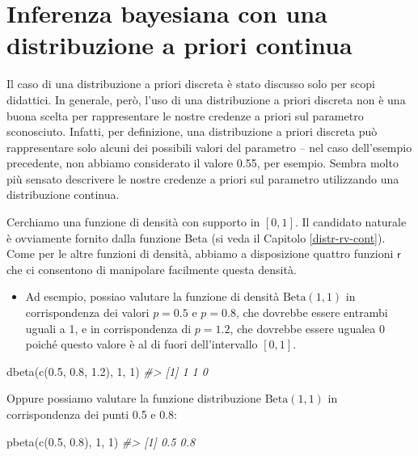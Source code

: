 \documentclass[
  11pt,
]{krantz}
\makeatletter
\newenvironment{Shaded}{\begin{snugshade}}{\end{snugshade}}
\newcommand{\CommentTok}[1]{\textcolor[rgb]{0.37,0.37,0.37}{\textit{#1}}}
\newcommand{\DecValTok}[1]{\textcolor[rgb]{0.06,0.06,0.06}{#1}}
\newcommand{\FloatTok}[1]{\textcolor[rgb]{0.06,0.06,0.06}{#1}}
\newcommand{\FunctionTok}[1]{\textcolor[rgb]{0,0,0}{#1}}
\newcommand{\NormalTok}[1]{#1}
\providecommand{\tightlist}{%
  \setlength{\itemsep}{0pt}\setlength{\parskip}{0pt}}
\newenvironment{kframe}{%
\medskip{}
\setlength{\fboxsep}{.8em}
 \def\at@end@of@kframe{}%
 \ifinner\ifhmode%
  \def\at@end@of@kframe{\end{minipage}}%
  \begin{minipage}{\columnwidth}%
 \fi\fi%
 \def\FrameCommand##1{\hskip\@totalleftmargin \hskip-\fboxsep
 \colorbox{shadecolor}{##1}\hskip-\fboxsep
     \hskip-\linewidth \hskip-\@totalleftmargin \hskip\columnwidth}%
 \MakeFramed {\advance\hsize-\width
   \@totalleftmargin\z@ \linewidth\hsize
   \@setminipage}}%
 {\par\unskip\endMakeFramed%
 \at@end@of@kframe}
\renewenvironment{Shaded}{\begin{kframe}}{\end{kframe}}
\theoremstyle{definition}
\theoremstyle{definition}
\theoremstyle{definition}
\theoremstyle{definition}
\theoremstyle{remark}
\makeatother
\begin{document}
\hypertarget{ch-prior-cont-binom}{%
\section{Inferenza bayesiana con una distribuzione a priori continua}\label{ch-prior-cont-binom}}

Il caso di una distribuzione a priori discreta è stato discusso solo per scopi didattici. In generale, però, l'uso di una distribuzione a priori discreta non è una buona scelta per rappresentare le nostre credenze a priori sul parametro sconosciuto. Infatti, per definizione, una distribuzione a priori discreta può rappresentare solo alcuni dei possibili valori del parametro -- nel caso dell'esempio precedente, non abbiamo considerato il valore 0.55, per esempio. Sembra molto più sensato descrivere le nostre credenze a priori sul parametro utilizzando una distribuzione continua.

Cerchiamo una funzione di densità con supporto in \([0, 1]\). Il candidato naturale è ovviamente fornito dalla funzione Beta (si veda il Capitolo \ref{distr-rv-cont}). Come per le altre funzioni di densità, abbiamo a disposizione quattro funzioni \(\textsf{r}\) che ci consentono di manipolare facilmente questa densità.

\begin{itemize}
\tightlist
\item
  Ad esempio, possiao valutare la funzione di densità \(\mbox{Beta}(1, 1)\) in corrispondenza dei valori \(p = 0.5\) e \(p = 0.8\), che dovrebbe essere entrambi uguali a 1, e in corrispondenza di \(p = 1.2\), che dovrebbe essere ugualea 0 poiché questo valore è al di fuori dell'intervallo \([ 0, 1]\).
\end{itemize}

\begin{Shaded}
\begin{Highlighting}[]
\FunctionTok{dbeta}\NormalTok{(}\FunctionTok{c}\NormalTok{(}\FloatTok{0.5}\NormalTok{, }\FloatTok{0.8}\NormalTok{, }\FloatTok{1.2}\NormalTok{), }\DecValTok{1}\NormalTok{, }\DecValTok{1}\NormalTok{)}
\CommentTok{\#\textgreater{} [1] 1 1 0}
\end{Highlighting}
\end{Shaded}

Oppure possiamo valutare la funzione distribuzione \(\mbox{Beta}(1, 1)\) in corrispondenza dei punti 0.5 e 0.8:

\begin{Shaded}
\begin{Highlighting}[]
\FunctionTok{pbeta}\NormalTok{(}\FunctionTok{c}\NormalTok{(}\FloatTok{0.5}\NormalTok{, }\FloatTok{0.8}\NormalTok{), }\DecValTok{1}\NormalTok{, }\DecValTok{1}\NormalTok{)}
\CommentTok{\#\textgreater{} [1] 0.5 0.8}
\end{Highlighting}
\end{Shaded}
\end{document}
